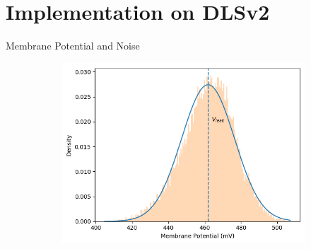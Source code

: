\documentclass[12pt, aspectratio=169]{beamer}
\begin{document}
\section[Implementation on DLSv2]{Implementation on DLSv2}
\begin{frame}{Membrane Potential and Noise}
    \begin{figure}[!htb]    	
        \centering
            \begin{figure}
               \scalebox{1.75}{}
                \label{neural network}
            \end{figure}
      	\endminipage\hfill
        	\vspace{20pt}
      	    \centering
            \begin{figure}
                \includegraphics[scale=0.5]{activation_function_vmem_distr.png}
                \label{membrane_potential}
            \end{figure}
        \endminipage\hfill
    \end{figure}
\end{frame}
\end{document}
